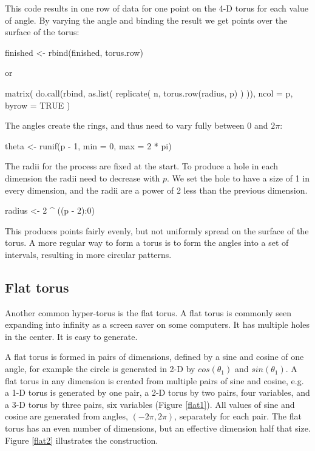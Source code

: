 This code results in one row of data for one point on the 4-D torus
for each value of angle.  By varying the angle and binding the result
we get points over the surface of the torus:

\begin{example}
finished <- rbind(finished, torus.row)
\end{example}

or

\begin{example}
matrix(
  do.call(rbind, as.list(
    replicate(
      n,
      torus.row(radius, p)
    )
  )),
  ncol = p, byrow = TRUE
)
\end{example}

The angles create the rings, and thus need to vary fully between 0 and
$2\pi$:

\begin{example}
theta <- runif(p - 1, min = 0, max = 2 * pi)
\end{example}

The radii for the process are fixed at the start.  To produce a hole
in each dimension the radii need to decrease with $p$.  We set the
hole to have a size of 1 in every dimension, and the radii are a power
of 2 less than the previous dimension.

\begin{example}
radius <- 2 ^ ((p - 2):0)
\end{example}

\noindent This produces points fairly evenly, but not uniformly spread on the surface of
the torus.  A more regular way to form a torus is to form the angles
into a set of intervals, resulting in more circular patterns.

\subsection{Flat torus}

Another common hyper-torus is the flat torus. A flat torus is commonly
seen expanding into infinity as a screen saver on some computers. It
has multiple holes in the center. It is easy to generate.

A flat torus is formed in pairs of dimensions, defined by a sine and
cosine of one angle, for example the circle is generated in 2-D by
$cos(\theta_1)$ and $sin(\theta_1)$.  A flat torus in any dimension is created
from multiple pairs of sine and cosine, e.g. a 1-D torus is generated by
one pair, a 2-D torus by two pairs, four variables, and a 3-D torus by
three pairs, six variables (Figure \ref{flat1}).  All values of sine
and cosine are generated from angles, $(-2\pi, 2\pi)$, separately for
each pair.  The flat torus has an even number of dimensions, but an
effective dimension half that size. Figure \ref{flat2} illustrates the
construction.

